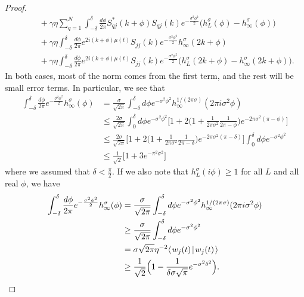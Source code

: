 \documentclass[../thesis-main/thesis-main]{subfiles}
\begin{document}
\begin{proof}
\begin{align}
    &\qquad  + \gamma \eta\sum_{q=1}^N \int_{-\delta}^{\delta} \frac{d\phi}{2\pi} S_{qj}^*(k+\phi)S_{qj}(k) e^{-\frac{\sigma^2\phi^2}{2}} \big(h_L^\sigma(\phi) - h_\infty^\sigma(\phi)\big) \nonumber\\
    &\qquad + \gamma \eta \int_{-\delta}^\delta \frac{d\phi}{2\pi} e^{2 i (k+\phi)\mu(t)} S_{jj}(k) e^{-\frac{\sigma^2\phi^2}{2}}  h_\infty^\sigma(2k+\phi)\nonumber \\
    &\qquad + \gamma \eta \int_{-\delta}^\delta \frac{d\phi}{2\pi} e^{2 i (k+\phi)\mu(t)} S_{jj}(k)e^{-\frac{\sigma^2\phi^2}{2}}  \big(h_{L}^\sigma(2k+\phi) - h_\infty^\sigma(2k+\phi )\big).
\end{align}
In both cases, most of the norm comes from the first term, and the rest will be small error terms.  In particular, we see that
\begin{align}
   \int_{-\delta}^\delta \frac{d\phi}{2\pi} e^{-\frac{\sigma^2\phi^2}{2}} h_\infty^\sigma(\phi) &= \frac{\sigma}{\sqrt{2\pi}} \int_{-\delta}^\delta d\phi e^{-\sigma^2 \phi^2} h_{\infty}^{1/(2\pi\sigma)}(2\pi i \sigma^2 \phi)\\
   &\leq \frac{2\sigma}{\sqrt{2\pi}} \int_0^\delta d\phi e^{ - \sigma^2 \phi^2} \Big[ 1 + 2 \Big( 1 + \frac{1}{2\pi \sigma^2} \frac{1}{ 2\pi - \phi}\Big) e^{ - 2\pi \sigma^2 (\pi - \phi)}\Big]\\
   & \leq \frac{2\sigma}{\sqrt{2\pi}} \Big[ 1 + 2 \Big( 1 + \frac{1}{2\pi \sigma^2} \frac{1}{ 2\pi - \delta }\Big) e^{ - 2\pi \sigma^2 (\pi - \delta)}\Big] \int_{0}^{\delta} d\phi e^{ - \sigma^2 \phi^2} \\
   &\leq \frac{1}{\sqrt{2}} \Big[ 1 + 3 e^{ - \pi^2 \sigma^2}\Big]\label{eq:gaussian_approx_gh}
\end{align}
where we assumed that $\delta < \frac{\pi}{2}$. If we also note that $h_L^\sigma(i\phi) \geq 1$ for all $L$ and all real $\phi$, we have 
\begin{align}
  \int_{-\delta}^\delta \frac{d\phi}{2\pi} e^{-\frac{\sigma^2\phi^2}{2}} h_\infty^\sigma(\phi) &= \frac{\sigma}{\sqrt{2\pi}} \int_{-\delta}^\delta d\phi e^{-\sigma^2 \phi^2} h_{\infty}^{1/(2\pi\sigma)}(2\pi i \sigma^2 \phi)\\
  &\geq \frac{\sigma}{\sqrt{2\pi}} \int_{-\delta}^\delta d\phi e^{-\sigma^2\phi^2} \\
  &= \sigma \sqrt{2\pi} \eta^{-2} \langle\mspace{2mu} w_j(t) \mspace{2mu} | \mspace{2mu} w_j(t)\mspace{2mu} \rangle\\
  & \geq \frac{1}{\sqrt{2}}\Big( 1 - \frac{1}{\delta \sigma \sqrt{\pi}} e^{-\sigma^2\delta^2}\Big).
\end{align}


\end{proof}
\end{document}
